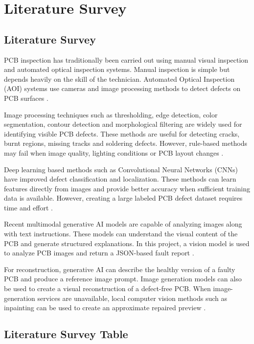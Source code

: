 \documentclass[12pt,a4paper]{report}
\begin{document}

\chapter{Literature Survey}

\section{Literature Survey}

PCB inspection has traditionally been carried out using manual visual inspection and automated optical inspection systems. Manual inspection is simple but depends heavily on the skill of the technician. Automated Optical Inspection (AOI) systems use cameras and image processing methods to detect defects on PCB surfaces \cite{ref1}.

Image processing techniques such as thresholding, edge detection, color segmentation, contour detection and morphological filtering are widely used for identifying visible PCB defects. These methods are useful for detecting cracks, burnt regions, missing tracks and soldering defects. However, rule-based methods may fail when image quality, lighting conditions or PCB layout changes \cite{ref2}.

Deep learning based methods such as Convolutional Neural Networks (CNNs) have improved defect classification and localization. These methods can learn features directly from images and provide better accuracy when sufficient training data is available. However, creating a large labeled PCB defect dataset requires time and effort \cite{ref3}.

Recent multimodal generative AI models are capable of analyzing images along with text instructions. These models can understand the visual content of the PCB and generate structured explanations. In this project, a vision model is used to analyze PCB images and return a JSON-based fault report \cite{ref4}.

For reconstruction, generative AI can describe the healthy version of a faulty PCB and produce a reference image prompt. Image generation models can also be used to create a visual reconstruction of a defect-free PCB. When image-generation services are unavailable, local computer vision methods such as inpainting can be used to create an approximate repaired preview \cite{ref5}.

\section{Literature Survey Table}
\end{document}
